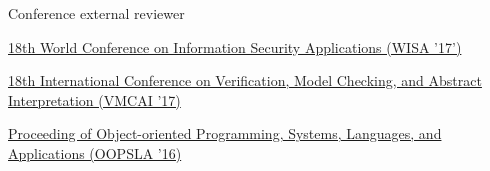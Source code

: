 

\begin{cventries}
  \cventry
    {Conference external reviewer} %
    {}
    {}
    {}
    {
      \begin{cvitems} %
        \item \href{http://www.wisa.or.kr/}{18th World Conference on Information Security Applications (WISA '17')}
        \item \href{http://conf.researchr.org/home/VMCAI-2017}{18th International Conference on Verification, Model Checking, and Abstract Interpretation (VMCAI '17)}
        \item \href{http://2016.splashcon.org/track/splash-2016-oopsla}{Proceeding of Object-oriented Programming, Systems, Languages, and Applications (OOPSLA '16)}
      \end{cvitems}
    }
\end{cventries}








